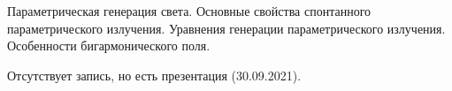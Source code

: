
\begin{leftrules}
Параметрическая генерация света. Основные свойства спонтанного параметрического излучения. Уравнения генерации параметрического излучения. Особенности бигармонического поля.
\end{leftrules}



Отсутствует запись, но есть презентация (30.09.2021).